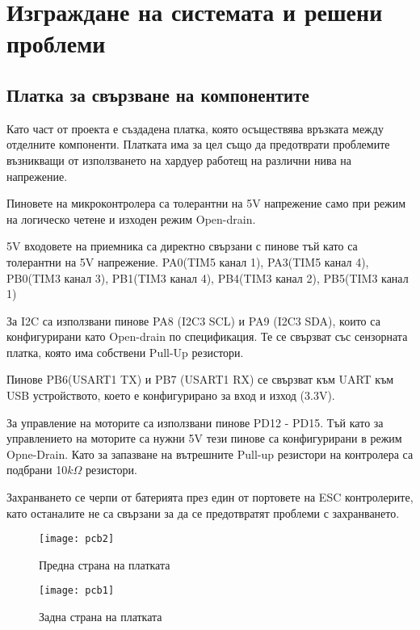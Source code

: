 \section{Изграждане на системата и решени проблеми}



\subsection{Платка за свързване на компонентите}

Като част от проекта е създадена платка, която осъществява връзката между отделните компоненти.
Платката има за цел също да предотврати проблемите възникващи от използването на хардуер работещ на различни
нива на напрежение. 

Пиновете на микроконтролера са толерантни на 5V напрежение само при режим на логическо четене и изходен режим Open-drain.

5V входовете на приемника са директно свързани с пинове тъй като са толерантни на 5V напрежение.
PA0(TIM5 канал 1), PA3(TIM5 канал 4),
PB0(TIM3 канал 3),  PB1(TIM3 канал 4), 
PB4(TIM3 канал 2), PB5(TIM3 канал 1)

За I2C са използвани пинове PA8 (I2C3 SCL) и PA9 (I2C3 SDA),
които са конфигурирани като Open-drain по спецификация.
Те се свързват със сензорната платка, която има собствени Pull-Up резистори.

Пинове PB6(USART1 TX) и PB7 (USART1 RX) се свързват към
UART към USB устройството, което е конфигурирано за вход и изход (3.3V).

За управление на моторите са използвани пинове PD12 - PD15. 
Тъй като за управлението на моторите са нужни 5V тези пинове са конфигурирани в режим Opne-Drain.
Като за запазване на вътрешните Pull-up резистори на контролера са подбрани \cite{pull_up} 
10\(k\Omega\) резистори.

Захранването се черпи от батерията през един от портовете на ESC контролерите, като останалите не са свързани за да се предотвратят проблеми с захранването.



\begin{figure}[htpb!]
    \centering
    \texttt{[image: pcb2]}
    \caption{Предна страна на платката}
    \label{fig:pnb_f}
\end{figure}

\begin{figure}[htpb!]
    \centering
    \texttt{[image: pcb1]}
    \caption{Задна страна на платката}
    \label{fig:pcb_b}
\end{figure}




